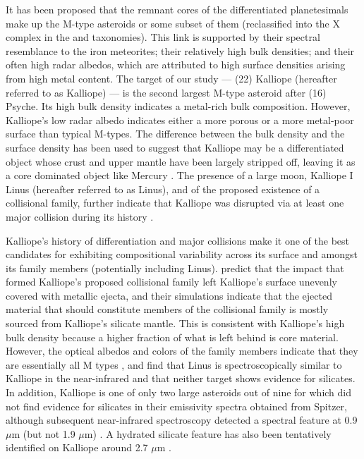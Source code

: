 \documentclass[]{aastex631}
\begin{document}
It has been proposed that the remnant cores of the differentiated planetesimals make up the M-type asteroids or some subset of them \citep{cloutis1990}  (reclassified into the X complex in the \cite{bus1999} and \cite{demeo2009} taxonomies). This link is supported by their spectral resemblance to the iron meteorites; their relatively high bulk densities; and their often high radar albedos, which are attributed to high surface densities arising from high metal content. The target of our study --- (22) Kalliope (hereafter referred to as Kalliope) --- is the second largest M-type asteroid after (16) Psyche. Its high bulk density \citep[4.40$\pm$0.46 g cm$^{-3}$;][]{ferrais2022} indicates a metal-rich bulk composition. However, Kalliope's low radar albedo \cite[0.18$\pm$0.05, corresponding to a surface density of 2.3 g cm$^{-3}$;][]{shepard2015} indicates either a more porous or a more metal-poor surface than typical M-types. The difference between the bulk density and the surface density has been used to suggest that Kalliope may be a differentiated object whose crust and upper mantle have been largely stripped off, leaving it as a core dominated object like Mercury \citep{ferrais2022}. The presence of a large moon, Kalliope I Linus (hereafter referred to as Linus), and of the proposed existence of a collisional family, further indicate that Kalliope was disrupted via at least one major collision during its history \citep{merline2001,margot2001,broz2022}.

Kalliope's history of differentiation and major collisions make it one of the best candidates for exhibiting compositional variability across its surface and amongst its family members (potentially including Linus). \cite{broz2022} predict that the impact that formed Kalliope's proposed collisional family left Kalliope's surface unevenly covered with metallic ejecta, and their simulations indicate that the ejected material that should constitute members of the collisional family is mostly sourced from Kalliope's silicate mantle. This is consistent with Kalliope's high bulk density because a higher fraction of what is left behind is core material. However, the optical albedos and colors of the family members indicate that they are essentially all M types \citep{broz2022}, and \cite{laver2009} find that Linus is spectroscopically similar to Kalliope in the near-infrared and that neither target shows evidence for silicates. In addition, Kalliope is one of only two large asteroids out of nine for which \cite{marchis2012} did not find evidence for silicates in their emissivity spectra obtained from Spitzer, although subsequent near-infrared spectroscopy detected a spectral feature at 0.9 $\mu$m (but not 1.9 $\mu$m) \citep{ockert-bell2010,hardersen2011,neeley2014}. A hydrated silicate feature has also been tentatively identified on Kalliope around 2.7 $\mu$m \citep{rivkin2000,usui2019}.
\end{document}

